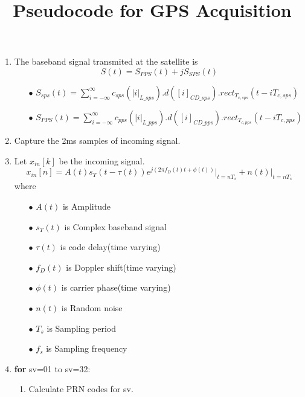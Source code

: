 \documentclass[journal,10pt,onecolumn]{article}
\title{\textbf{Pseudocode for GPS Acquisition}}
\begin{document}
\maketitle

\begin{enumerate}

    \item The baseband signal transmited at the satellite is
    \begin{equation}
        S(t) = S_{PPS}(t)+ jS_{SPS}(t)
    \end{equation} 
    \begin{enumerate}
        \item[$\bullet$]  $S_{sps}(t) = 	\sum_{i=-\infty}^{\infty}  c_{sps}(|i|_{L\_sps}) . d([i]_{CD\_sps}) . rect_{T_{c,sps}}(t-iT_{c,sps})$
        \item[$\bullet$] $S_{PPS}(t) = 	\sum_{i=-\infty}^{\infty}  c_{pps}(|i|_{L\_pps}) . d([i]_{CD\_pps}) . rect_{T_{c,pps}}(t-iT_{c,pps}) $
    \end{enumerate}
	\item Capture  the 2ms samples of incoming signal.
    \item Let $x_{in}[k]$ be the incoming signal.
	\begin{equation}
        x_{in}[n] = A(t) s_T(t-\tau (t))e^{j(2\pi f_D (t)t+\phi (t))}|_{t=nT_s}  + n(t)\vert _{t=nT_s}
    \end{equation}
    where \\
    \begin{enumerate}
        \item[$\bullet$] $A(t)$ is Amplitude
        \item[$\bullet$] $s_T(t)$ is Complex baseband signal
        \item[$\bullet$] $\tau(t)$ is code delay(time varying)
        \item[$\bullet$] $f_D(t)$ is Doppler shift(time varying)
        \item[$\bullet$] $\phi(t)$ is carrier phase(time varying)
        \item[$\bullet$]  $n(t)$ is Random noise
        \item[$\bullet$] $T_s$ is Sampling period
        \item[$\bullet$] $f_s$ is Sampling frequency
    \end{enumerate}
	\item \textbf{for} sv=01 to sv=32:
    \begin{enumerate}
        \item Calculate PRN codes for sv.

\end{enumerate}
\end{enumerate}
\end{document}
